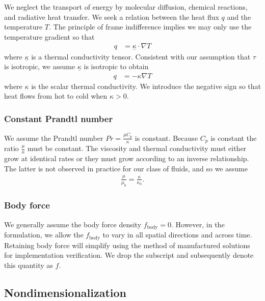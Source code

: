 \documentclass[letterpaper,11pt,nointlimits,reqno]{amsart}
\begin{document}
We neglect the transport of energy by molecular diffusion, chemical
reactions, and radiative heat transfer.  We seek a relation between
the heat flux $q$ and the temperature $T$.  The principle of 
frame indifference implies we may only use the temperature gradient
so that
\begin{align}
  \label{eq:fouriertensorlaw}
  q &= \underline{\kappa} \cdot \nabla{} T
\end{align}
where $\underline{\kappa}$ is a thermal conductivity tensor.  
Consistent with our assumption that $\tau$ is isotropic, we assume
$\underline{\kappa}$ is isotropic to obtain 
\begin{align}
  \label{eq:fourierlaw}
  q &= - \kappa \nabla{} T
\end{align}
where $\kappa$ is the scalar thermal conductivity.  We introduce the
negative sign so that heat flows from hot to cold when $\kappa>0$.

\subsubsection{Constant Prandtl number}

We assume the Prandtl number $Pr = \frac{\mu{}C_{p}}{\kappa}$ is constant.
Because $C_{p}$ is constant the ratio $\frac{\mu}{\kappa}$ must be
constant.  The viscosity and thermal conductivity must either grow at
identical rates or they must grow according to an inverse relationship.
The latter is not observed in practice for our class of fluids, and
so we assume
\begin{align}
  \frac{\mu}{\mu_{0}} = \frac{\kappa}{\kappa_{0}}
  .
  \label{eq:mukappa}
\end{align}

\subsubsection{Body force}

We generally assume the body force density $f_{\text{body}}=0$.  However,
in the formulation, we allow the $f_{\text{body}}$ to vary in all spatial
directions and across time.  Retaining body force will simplify using
the method of manufactured solutions for implementation verification.
We drop the subscript and subsequently denote this quantity as $f$.


\subsection{Nondimensionalization}
\end{document}
